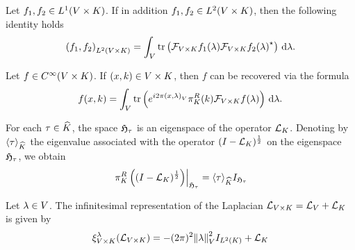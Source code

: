 \begin{proposition}
    Let $f_1, f_2 \in \Lebesgue 1 \GroupDirect$.
    If in addition $f_1, f_2 \in \Lebesgue 2 \GroupDirect$,
    then the following identity holds
    \begin{align*}
        \ip [\Lebesgue 2 \GroupDirect] {f_1} {f_2}
        = \int_\VectorSpace \tr\left(\Fourier [\GroupDirect] f_1(\lambda) \adj{\Fourier [\GroupDirect] f_2(\lambda)}\right) \dd \lambda.
    \end{align*}
\end{proposition}

\begin{proposition}
    Let $f \in \SmoothFunctions \GroupDirect$.
    If $(x, k) \in \GroupDirect$,
    then $f$ can be recovered via the formula
    \begin{align*}
        f(x, k) = \int_\VectorSpace \tr\left(\e^{\i \turn \ip x \lambda} \RightRegularRepresentation(k) \Fourier[\GroupDirect] f(\lambda) \right) \dd \lambda.
    \end{align*}
\end{proposition}

\begin{lemma}
    For each $\tau \in \dualGroup\CompactGroup$,
    the space $\HilbertCompactGroup{\tau}$ is an eigenspace of the operator $\Laplacian[\CompactGroup]$.
    Denoting by $\JapaneseBracket{\CompactGroup}{\tau}$ the eigenvalue associated with the operator $\BesselPotential[\CompactGroup]{1}$ on the eigenspace $\HilbertCompactGroup\tau$, we obtain
    \begin{align*}
        \eval{\RightRegularRepresentation\left(\BesselPotential[\CompactGroup]{1}\right)}{\HilbertCompactGroup\tau}
        = \JapaneseBracket{\CompactGroup}{\tau} \Id{\HilbertCompactGroup\tau}
    \end{align*}
\end{lemma}

\begin{lemma}
    Let $\lambda \in \VectorSpace$.
    The infinitesimal representation of the Laplacian $\Laplacian [\GroupDirect] = \Laplacian [\VectorSpace] + \Laplacian [\CompactGroup]$
    is given by
    \begin{align*}
        \Rep [\GroupDirect] \lambda (\Laplacian [\GroupDirect])
        = - (\turn)^2 \norm \lambda^2 \Id{\Lebesgue 2 \CompactGroup} + \Laplacian [\CompactGroup]
    \end{align*}
\end{lemma}

